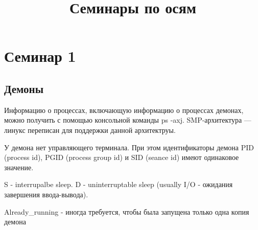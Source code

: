 \title{Семинары по осям}
\chapter{Семинар 1}
\section{Демоны}
Информацию о процессах, включающую информацию о процессах демонах, можно получить с помощью консольной команды ps -axj. SMP-архитектура --- линукс переписан для поддержки данной архитектруы. 

У демона нет управляющего терминала. При этом идентификаторы демона PID (process id), PGID (process group id) и SID (seance id) имеют одинаковое значение. 

S - interrupalbe sleep. D - uninterruptable sleep (usually I/O - ожидания завершения ввода-вывода).

Already\_running - иногда требуется, чтобы была запущена только одна копия демона 